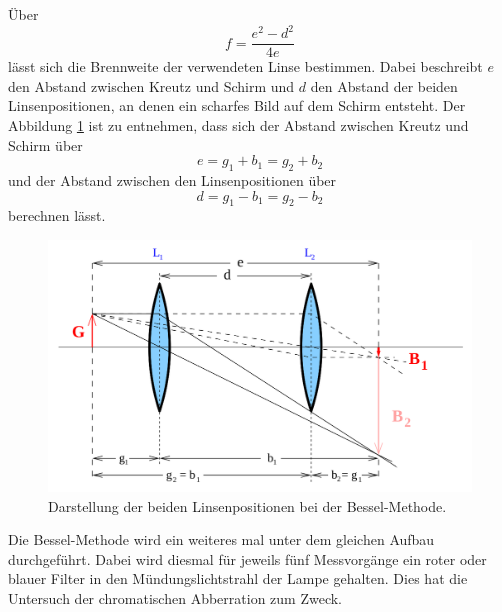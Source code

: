 Über 
\begin{equation}
    f=\frac{e^2-d^2}{4e}
\end{equation}
lässt sich die Brennweite der verwendeten Linse bestimmen. Dabei beschreibt $e$ den Abstand zwischen Kreutz und Schirm und $d$ den Abstand der beiden Linsenpositionen, an denen ein scharfes Bild auf dem Schirm entsteht.
Der Abbildung \ref{fig:Bessel} ist zu entnehmen, dass sich der Abstand zwischen Kreutz und Schirm über
\begin{equation}
    e=g_1+b_1=g_2+b_2
\end{equation}
und der Abstand zwischen den Linsenpositionen über
\begin{equation}
    d=g_1-b_1=g_2-b_2
\end{equation}
berechnen lässt.


\begin{figure}
    \centering
    \includegraphics[width=\textwidth]{data/Bessel.png}
    \caption{Darstellung der beiden Linsenpositionen bei der Bessel-Methode.}
    \label{fig:Bessel}
\end{figure}


Die Bessel-Methode wird ein weiteres mal unter dem gleichen Aufbau durchgeführt. Dabei wird diesmal für jeweils fünf Messvorgänge ein roter oder blauer Filter in den Mündungslichtstrahl der Lampe gehalten. Dies hat die Untersuch der chromatischen Abberration zum Zweck.



